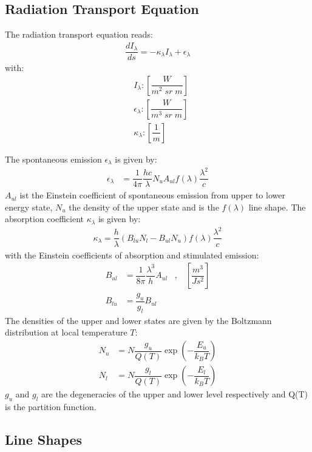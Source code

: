 \subsection{Radiation Transport Equation}

The radiation transport equation reads:
\begin{align}
	\label{eqn1}
	\dfrac{d I_{\lambda}}{ds} = - \kappa_\lambda I_{\lambda} + 	\epsilon_\lambda
\end{align}
with:
\begin{align*}
	&I_{\lambda}    : \left[\dfrac{W}{m^2 \; sr \; m}\right] \\
	&\epsilon_{\lambda} : \left[\dfrac{W}{m^3 \; sr \; m}\right] \\
	&\kappa_{\lambda}   : \left[\dfrac{1}{m}\right]
\end{align*}

The spontaneous emission $\epsilon_\lambda$ is given by:
\begin{align}
	\epsilon_\lambda &= \dfrac{1}{4 \pi} \dfrac{h c}{\lambda} N_u A_{ul} f(\lambda)
	 \dfrac{\lambda^2}{c}
\end{align}
$A_{ul}$ ist the Einstein coefficient of spontaneous emission from upper to lower energy state, $N_u$ the density of the upper state and is the
$f(\lambda)$ line shape. The absorption coefficient $\kappa_\lambda$ is given by:
\begin{align}
	\kappa_\lambda  = \dfrac{h}{\lambda}  \left(  B_{lu} N_l -  B_{ul} N_u \right) f(\lambda)
	 \dfrac{\lambda^2}{c}
\end{align}
with the Einstein coefficients of absorption and stimulated emission:
\begin{align}
	B_{ul} &= \dfrac{1}{8 \pi} \dfrac{\lambda^3}{h} A_{ul} \;\;\; , \;\;\; \left[\dfrac{m^3}{J s^2}\right] \\
	B_{lu} &= \dfrac{g_u}{g_l} B_{ul}
\end{align}
The densities of the upper and lower states are given by the Boltzmann distribution at local temperature $T$:
\begin{align}
	N_u &= N \dfrac{g_u}{Q(T)} \exp\left(- \dfrac{E_u}{k_B T} \right) \\
	N_l &= N \dfrac{g_l}{Q(T)} \exp\left(- \dfrac{E_l}{k_B T} \right)
\end{align}
$g_u$ and $g_l$ are the degeneracies of the upper and lower level respectively and Q(T) is the partition function.


\subsection{Line Shapes}

